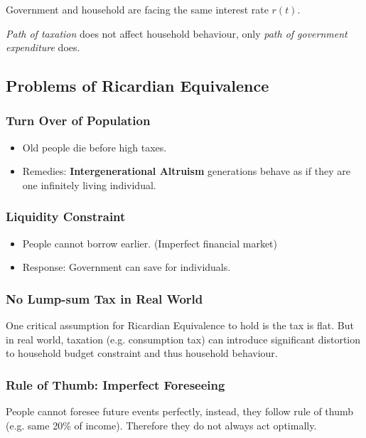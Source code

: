 \documentclass[11pt]{article}
\begin{document}
			\begin{assumption}
				Government and household are facing the same interest rate $r(t)$.
			\end{assumption}
				
			\begin{proposition}
				\emph{Path of taxation} does not affect household behaviour, only \emph{path of government expenditure} does.
			\end{proposition}
			
		\subsection{Problems of Ricardian Equivalence}
			\subsubsection{Turn Over of Population}
				\begin{itemize}
					\item Old people die before high taxes.
					\item Remedies: \textbf{Intergenerational Altruism} generations behave as if they are one infinitely living individual.
				\end{itemize}
				
			\subsubsection{Liquidity Constraint}
				\begin{itemize}
					\item People cannot borrow earlier. (Imperfect financial market)
					\item Response: Government can save for individuals.
				\end{itemize}
			
			\subsubsection{No Lump-sum Tax in Real World}
				\par One critical assumption for Ricardian Equivalence to hold is the tax is flat. But in real world, taxation (e.g. consumption tax) can introduce significant distortion to household budget constraint and thus household behaviour.
				
			\subsubsection{Rule of Thumb: Imperfect Foreseeing}
				\par People cannot foresee future events perfectly, instead, they follow rule of thumb (e.g. same 20\% of income). Therefore they do not always act optimally.
				
\end{document}
